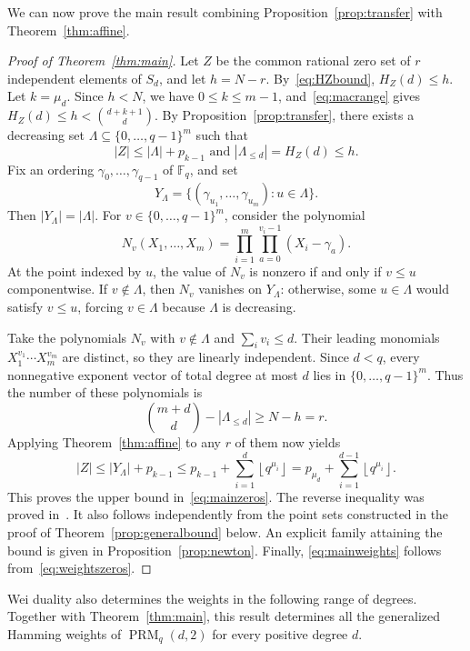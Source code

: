 \documentclass[11pt]{amsart}
\theoremstyle{definition}
\newcommand{\F}{\mathbb F}
\newcommand{\PRM}{\operatorname{PRM}}
\newcommand{\card}[1]{\left|#1\right|}
\newcommand{\sq}[1]{\left\lfloor q^{#1}\right\rfloor}
\numberwithin{equation}{section}
\begin{document}
We can now prove the main result combining Proposition~\ref{prop:transfer} with Theorem~\ref{thm:affine}.

\begin{proof}[Proof of Theorem~\ref{thm:main}]
Let $Z$ be the common rational zero set of $r$ independent elements
of $S_d$, and let $h=N-r$. By~\eqref{eq:HZbound}, $H_Z(d)\le h$.
Let $k=\mu_d$. Since $h<N$, we have $0\le k\le m-1$,
and~\eqref{eq:macrange} gives
$H_Z(d)\le h<\binom{d+k+1}{d}$. By
Proposition~\ref{prop:transfer}, there exists a decreasing set
$\Lambda\subseteq\{0,\ldots,q-1\}^m$ such that
\[
 \card Z\le\card\Lambda+p_{k-1}
 \text{ and } \card{\Lambda_{\le d}}=H_Z(d)\le h.
\]
Fix an ordering $\gamma_0,\ldots,\gamma_{q-1}$ of $\F_q$, and set
\[
 Y_\Lambda=\{(\gamma_{u_1},\ldots,\gamma_{u_m}):u\in\Lambda\}.
\]
Then $\card{Y_\Lambda}=\card\Lambda$.
For $v\in\{0,\ldots,q-1\}^m$, consider the polynomial
\begin{equation}\label{eq:affineproducts}
 N_v(X_1,\ldots,X_m)
 =\prod_{i=1}^m\prod_{a=0}^{v_i-1}(X_i-\gamma_a).
\end{equation}
At the point indexed by $u$, the value of $N_v$ is nonzero if and
only if $v\le u$ componentwise. If $v\notin\Lambda$, then $N_v$
vanishes on $Y_\Lambda$: otherwise, some $u\in\Lambda$ would satisfy
$v\le u$, forcing $v\in\Lambda$ because $\Lambda$ is decreasing.

Take the polynomials $N_v$ with $v\notin\Lambda$ and
$\sum_i v_i\le d$. Their leading monomials
$X_1^{v_1}\cdots X_m^{v_m}$ are distinct, so they are linearly
independent. Since $d<q$, every nonnegative exponent vector of
total degree at most $d$ lies in $\{0,\ldots,q-1\}^m$.
Thus the number of these polynomials is
\[
 \binom{m+d}{d}-\card{\Lambda_{\le d}}\ge N-h=r.
\]
Applying Theorem~\ref{thm:affine} to any $r$ of them now yields
\[
 \card Z
 \le\card{Y_\Lambda}+p_{k-1}
 \le p_{k-1}+\sum_{i=1}^d\sq{\mu_i}
 =p_{\mu_d}+\sum_{i=1}^{d-1}\sq{\mu_i}.
\]
This proves the upper bound in~\eqref{eq:mainzeros}.
The reverse inequality was proved in~\cite[Thm. 2.3 and Cor. 2.6]{BDG22}.
It also follows independently from the point sets constructed in the
proof of Theorem~\ref{prop:generalbound} below. An explicit family
attaining the bound is given in Proposition~\ref{prop:newton}. Finally,
\eqref{eq:mainweights} follows from~\eqref{eq:weightszeros}.
\end{proof}

Wei duality also determines the weights in the following range of degrees. Together with Theorem~\ref{thm:main}, this result determines all the generalized
Hamming weights of $\PRM_q(d,2)$ for every positive degree $d$.
\end{document}
